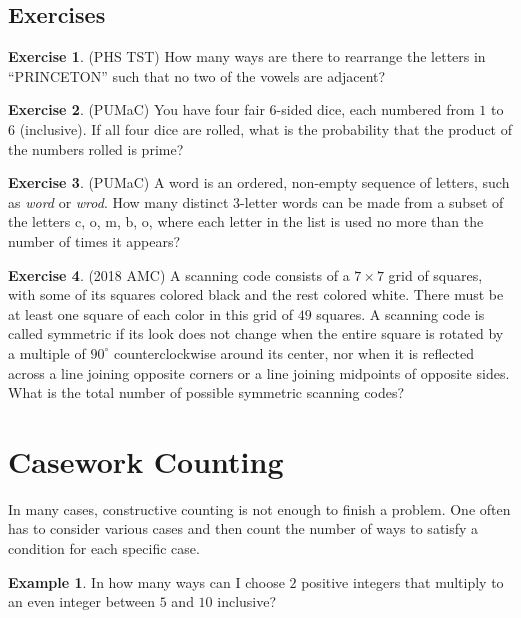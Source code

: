 \documentclass[l1pt]{article}
\theoremstyle{plain}
\theoremstyle{definition}
\newtheorem{example}[thm]{Example}
\newtheorem{exercise}{Exercise}[section]
\theoremstyle{remark}
\begin{document}
\subsection*{Exercises}

\begin{exercise}
(PHS TST) How many ways are there to rearrange the letters in “PRINCETON” such that no two of the vowels are
adjacent?
\end{exercise}

\begin{exercise}
(PUMaC) You have four fair $6$-sided dice, each numbered from $1$ to $6$ (inclusive). If all four dice are rolled, what is the probability that the product of the numbers rolled is prime?
\end{exercise}

\begin{exercise}
(PUMaC) A word is an ordered, non-empty sequence of letters, such as \textit{word} or \textit{wrod}. How many
distinct 3-letter words can be made from a subset of the letters c, o, m, b, o, where each letter
in the list is used no more than the number of times it appears?
\end{exercise}

\begin{exercise}
(2018 AMC) A scanning code consists of a $7 \times 7$ grid of squares, with some of its squares colored black and the rest colored white. There must be at least one square of each color in this grid of $49$ squares. A scanning code is called symmetric if its look does not change when the entire square is rotated by a multiple of $90 ^{\circ}$ counterclockwise around its center, nor when it is reflected across a line joining opposite corners or a line joining midpoints of opposite sides. What is the total number of possible symmetric scanning codes?
\end{exercise}

\section{Casework Counting}
In many cases, constructive counting is not enough to finish a problem. One often has to consider various cases and then count the number of ways to satisfy a condition for each specific case. 

\begin{example}
In how many ways can I choose $2$ positive integers that multiply to an even integer between $5$ and $10$ inclusive?
\end{example}
\end{document}
